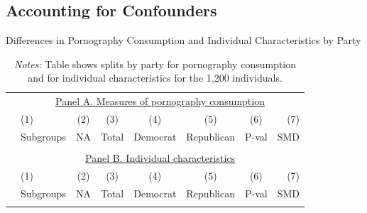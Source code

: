 \documentclass[12pt, letterpaper]{article}
\begin{document}
\subsection{Accounting for Confounders}
\begin{table}[ht] \centering \small \setlength\tabcolsep{5 pt}
	\caption{Differences in Pornography Consumption and Individual Characteristics by Party}
	\label{tab:characteristics_split_by_party}
	\begin{adjustbox}{max width=\textwidth}
		\begin{tabular}{@{\hspace{0\tabcolsep}}llrcccrr@{\hspace{0\tabcolsep}}}
			\toprule
			&\multicolumn{7}{c}{\underline{Panel A. Measures of pornography consumption}}\\
			&\multicolumn{1}{l}{(1)}&\multicolumn{1}{c}{(2)}&\multicolumn{1}{c}{(3)}&\multicolumn{1}{c}{(4)}&\multicolumn{1}{c}{(5)}&\multicolumn{1}{c}{(6)}&\multicolumn{1}{r}{(7)}\\			
			&\multicolumn{1}{l}{Subgroups}&\multicolumn{1}{c}{NA}&\multicolumn{1}{c}{Total}&\multicolumn{1}{c}{Democrat}&\multicolumn{1}{c}{Republican}&\multicolumn{1}{c}{P-val}&\multicolumn{1}{r}{SMD}\\
			\cmidrule{2-8}
			\\
			\cmidrule{2-8}
			&\multicolumn{7}{c}{\underline{Panel B. Individual characteristics}}\\
			&\multicolumn{1}{l}{(1)}&\multicolumn{1}{c}{(2)}&\multicolumn{1}{c}{(3)}&\multicolumn{1}{c}{(4)}&\multicolumn{1}{c}{(5)}&\multicolumn{1}{c}{(6)}&\multicolumn{1}{r}{(7)}\\			
			&\multicolumn{1}{l}{Subgroups}&\multicolumn{1}{c}{NA}&\multicolumn{1}{c}{Total}&\multicolumn{1}{c}{Democrat}&\multicolumn{1}{c}{Republican}&\multicolumn{1}{c}{P-val}&\multicolumn{1}{r}{SMD}\\
			\cmidrule{2-8}
			\\
			\bottomrule
		\end{tabular}
	\end{adjustbox}
	\caption*{\scriptsize \emph{Notes:}
		Table shows splits by party for pornography consumption and for individual characteristics for the 1,200 individuals.
}
\end{table}
\end{document}
